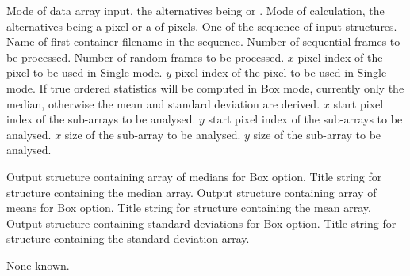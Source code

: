 {\begin{manroutinedescription}
\begin{manparametertable}
  Mode of data array input, the alternatives being {}
  or {}.
  Mode of calculation, the alternatives being a {} pixel or
  a {} of pixels.
  One of the sequence of input {} structures.
  Name of first container filename in the sequence.
  Number of sequential frames to be processed.
  Number of random frames to be processed.
  {$x$} pixel index of the pixel to be used in Single mode.
  {$y$} pixel index of the pixel to be used in Single mode.
  If true ordered statistics will be computed in Box mode,
  currently only the median, otherwise the mean and standard
  deviation are derived. \mbox{{\mantt [FALSE]}}
  {$x$} start pixel index of the sub-arrays to be analysed.
  {$y$} start pixel index of the sub-arrays to be analysed.
  {$x$} size of the sub-array to be analysed.
  {$y$} size of the sub-array to be analysed.
\end{manparametertable}
\begin{manparametertable}
  Output {} structure containing array of medians for Box
  option.
  Title string for {} structure containing the median array.
  \mbox{{}}
  Output {} structure containing array of means for Box
  option.
  Title string for {} structure containing the mean array.
  \mbox{{}}
  Output {} structure containing standard deviations for Box
  option.
  Title string for {} structure containing the
  standard-deviation array. \mbox{{}}
\end{manparametertable}
  None known.


\end{manroutinedescription}}
